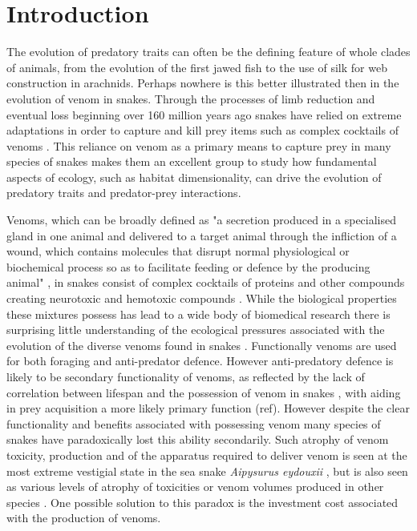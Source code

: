 \section{Introduction}

The evolution of predatory traits can often be the defining feature of whole clades of animals, from the evolution of the first jawed fish to the use of silk for web construction in arachnids. Perhaps nowhere is this better illustrated then in the evolution of venom in snakes. Through the processes of limb reduction and eventual loss beginning over 160 million years ago \citep{caldwell2015oldest} snakes have relied on extreme adaptations in order to capture and kill prey items such as complex cocktails of venoms \citep{casewell2013complex,fry2012structural}. This reliance on venom as a primary means to capture prey in many species of snakes makes them an excellent group to study how fundamental aspects of ecology, such as habitat dimensionality, can drive the evolution of predatory traits and predator-prey interactions.


Venoms, which can be broadly defined as "a secretion produced in a specialised gland in one animal and delivered to a target animal through the infliction of a wound, which contains molecules that disrupt normal physiological or biochemical process so as to facilitate feeding or defence by the producing animal" \citep{casewell2013complex}, in snakes consist of complex cocktails of proteins and other compounds creating neurotoxic and hemotoxic compounds \citep{greene1997snakes,casewell2013complex}. While the biological properties these mixtures possess has lead to a wide body of biomedical research there is surprising little understanding of the ecological pressures associated with the evolution of the diverse venoms found in snakes \citep{greene1997snakes,casewell2013complex}. Functionally venoms are used for both foraging and anti-predator defence. However anti-predatory defence is likely to be secondary functionality of venoms, as reflected by the lack of correlation between lifespan and the possession of venom in snakes \citep{hossie2013species}, with aiding in prey acquisition a more likely primary function (ref). However despite the clear functionality and benefits associated with possessing venom many species of snakes have paradoxically lost this ability secondarily. Such atrophy of venom toxicity, production and of the apparatus required to deliver venom is seen at the most extreme vestigial state in the sea snake \textit{Aipysurus eydouxii} \citep{li2005eggs}, but is also seen as various levels of atrophy of toxicities or venom volumes produced in other species \citep{fry2012structural}. One possible solution to this paradox is the investment cost associated with the production of venoms.


